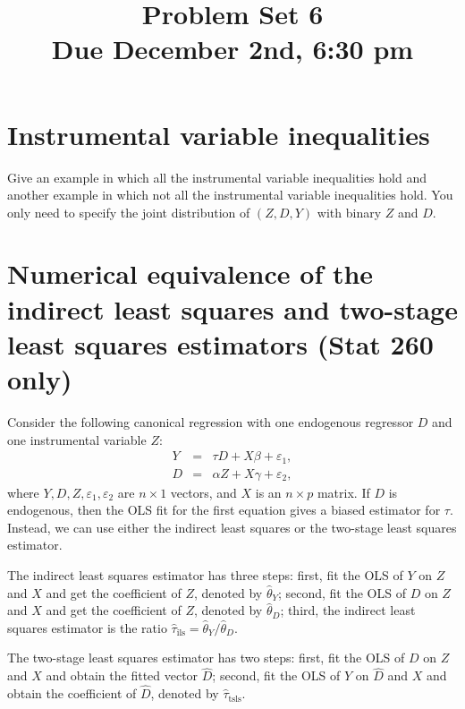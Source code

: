 \documentclass[11pt]{article}
\theoremstyle{definition}
\begin{document}
\doublespacing
\title{\bf  Problem Set 6\\
Due December 2nd, 6:30 pm} 
\date{}
\maketitle

 
\section{Instrumental variable inequalities}

Give an example in which all the instrumental variable inequalities hold and another example in which not all the instrumental variable inequalities hold. You only need to specify the joint distribution of $(Z,D,Y)$ with binary $Z$ and $D$. 


\section{Numerical equivalence of the indirect least squares and two-stage least squares estimators (Stat 260 only)}


Consider the following canonical regression with one endogenous regressor $D$ and one instrumental variable $Z$:
\begin{eqnarray*}
Y &=& \tau D + X \beta + \varepsilon_1,\\
D &=& \alpha  Z + X\gamma  +  \varepsilon_2,
\end{eqnarray*}
where $Y, D, Z, \varepsilon_1, \varepsilon_2$ are $n\times 1$ vectors, and $X$ is an $n\times p$ matrix. If $D$ is endogenous, then the OLS fit for the first equation gives a biased estimator for $\tau$. Instead, we can use either the indirect least squares or the two-stage least squares estimator. 

The indirect least squares estimator has three steps: first, fit the OLS of $Y$ on $Z$ and $X$ and get the coefficient of $Z$, denoted by $\hat{\theta}_Y$; second, fit the OLS of $D$ on $Z$ and $X$ and get the coefficient of $Z$, denoted by $\hat{\theta}_D$; third, the indirect least squares estimator is the ratio $ \hat{\tau}_{\text{ils}} =  \hat{\theta}_Y / \hat{\theta}_D.$ 



The two-stage least squares estimator has two steps: first, fit the OLS of $D$ on $Z$ and $X$ and obtain the fitted vector $\hat{D}$; second, fit the OLS of $Y$ on $\hat{D}$ and $X$ and obtain the coefficient of $\hat{D}$, denoted by $\hat{\tau}_{\text{tsls}}$. 
\end{document}
